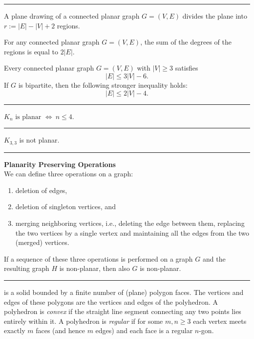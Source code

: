 \documentclass[a4paper]{extarticle}
\newcommand{\sep}{\vspace{5pt}\noindent\hrule\vspace{5pt}}
\begin{document}
\begin{multicols*}{2}
\sep

 A plane drawing of a connected planar graph
$G=(V,E)$ divides the plane into $r:=|E|-|V|+2$ regions. 

\Lem For any connected planar graph $G=(V,E)$, the sum of the degrees of
the regions is equal to $2|E|$. 

\Thm Every connected planar graph $G=(V,E)$ with $|V|\geq 3$ satisfies
\[
|E|\leq 3|V| -6.
\]
If $G$ is bipartite, then the following stronger inequality holds:
\[
|E|\leq2|V|-4.
\]
 
\sep

\Cor $K_n \text{ is planar }\Longleftrightarrow \ n\leq 4$. 

\sep

\Cor $K_{3,3}$ is not planar. 

\sep

\textbf{Planarity Preserving Operations}\\
We can define three operations on a graph:
\begin{enumerate}
  \item deletion of edges,
  \item deletion of singleton vertices, and
  \item merging neighboring vertices, i.e., deleting the edge between them,
  replacing the two vertices by a single vertex and maintaining all the edges
  from the two (merged) vertices.
\end{enumerate}

\Lem If a sequence of these three operations is performed on a graph $G$
and the resulting graph $H$ is non-planar, then also $G$ is non-planar. 

\sep

\Def[Polyhedron] is a solid bounded by a finite number of (plane)
polygon faces. The vertices and edges of these polygons are the vertices and
edges of the polyhedron. A polyhedron is \emph{convex} if the straight line
segment connecting any two points lies entirely within it. A polyhedron is
\emph{regular} if for some $m,n\geq 3$ each vertex meets exactly $m$ faces
(and hence $m$ edges) and each face is a regular $n$-gon. 


\end{multicols*}
\end{document}
